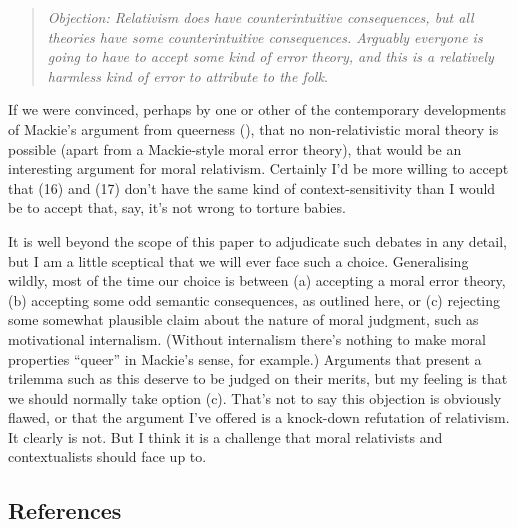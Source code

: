 \documentclass[
  10pt,
  letterpaper,
  DIV=11,
  numbers=noendperiod,
  twoside]{scrartcl}
\begin{document}
\begin{quote}
\emph{Objection: Relativism does have counterintuitive consequences, but
all theories have some counterintuitive consequences. Arguably everyone
is going to have to accept some kind of error theory, and this is a
relatively harmless kind of error to attribute to the folk}.
\end{quote}

If we were convinced, perhaps by one or other of the contemporary
developments of Mackie's argument from queerness
(), that no non-relativistic moral
theory is possible (apart from a Mackie-style moral error theory), that
would be an interesting argument for moral relativism. Certainly I'd be
more willing to accept that (16) and (17) don't have the same kind of
context-sensitivity than I would be to accept that, say, it's not wrong
to torture babies.

It is well beyond the scope of this paper to adjudicate such debates in
any detail, but I am a little sceptical that we will ever face such a
choice. Generalising wildly, most of the time our choice is between (a)
accepting a moral error theory, (b) accepting some odd semantic
consequences, as outlined here, or (c) rejecting some somewhat plausible
claim about the nature of moral judgment, such as motivational
internalism. (Without internalism there's nothing to make moral
properties ``queer'' in Mackie's sense, for example.) Arguments that
present a trilemma such as this deserve to be judged on their merits,
but my feeling is that we should normally take option (c). That's not to
say this objection is obviously flawed, or that the argument I've
offered is a knock-down refutation of relativism. It clearly is not. But
I think it is a challenge that moral relativists and contextualists
should face up to.

\subsection*{References}\label{references}
\end{document}
